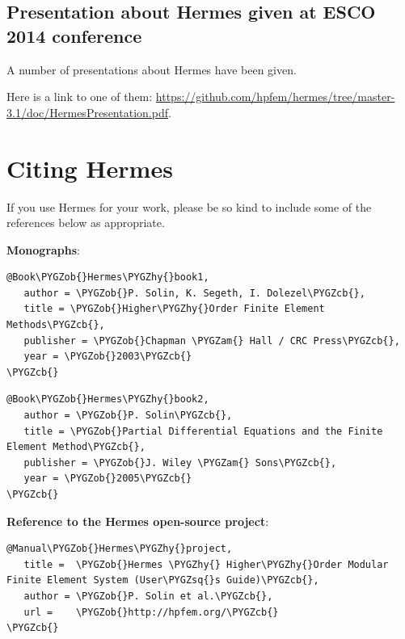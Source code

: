 \documentclass[a4paper,0pt,english]{sphinxmanual}
\let\origfigure=\figure
\renewenvironment{figure}[6]{
\origfigure[H]}
{\endlist}
\def\PYGZob{\char`\{}
\def\PYGZcb{\char`\}}
\def\PYGZam{\char`\&}
\def\PYGZhy{\char`\-}
\def\PYGZsq{\char`\'}
\begin{document}
\subsection{Presentation about Hermes given at ESCO 2014 conference}
\label{src/math-background:presentation-about-hermes-given-at-esco-2014-conference}
A number of presentations about Hermes have been given.
\begin{figure}[htbp]
\centering

\end{figure}

Here is a link to one of them: \href{https://github.com/hpfem/hermes/tree/master-3.1/doc/HermesPresentation.pdf}{https://github.com/hpfem/hermes/tree/master-3.1/doc/HermesPresentation.pdf}.


\section{Citing Hermes}
\label{src/citing-hermes::doc}\label{src/citing-hermes:citing-hermes}
If you use Hermes for your work, please be so kind to include some of the references below as appropriate.

\textbf{Monographs}:

\begin{Verbatim}[commandchars=\\\{\}]
@Book\PYGZob{}Hermes\PYGZhy{}book1,
   author = \PYGZob{}P. Solin, K. Segeth, I. Dolezel\PYGZcb{},
   title = \PYGZob{}Higher\PYGZhy{}Order Finite Element Methods\PYGZcb{},
   publisher = \PYGZob{}Chapman \PYGZam{} Hall / CRC Press\PYGZcb{},
   year = \PYGZob{}2003\PYGZcb{}
\PYGZcb{}
\end{Verbatim}

\begin{Verbatim}[commandchars=\\\{\}]
@Book\PYGZob{}Hermes\PYGZhy{}book2,
   author = \PYGZob{}P. Solin\PYGZcb{},
   title = \PYGZob{}Partial Differential Equations and the Finite Element Method\PYGZcb{},
   publisher = \PYGZob{}J. Wiley \PYGZam{} Sons\PYGZcb{},
   year = \PYGZob{}2005\PYGZcb{}
\PYGZcb{}
\end{Verbatim}

\textbf{Reference to the Hermes open-source project}:

\begin{Verbatim}[commandchars=\\\{\}]
@Manual\PYGZob{}Hermes\PYGZhy{}project,
   title =  \PYGZob{}Hermes \PYGZhy{} Higher\PYGZhy{}Order Modular Finite Element System (User\PYGZsq{}s Guide)\PYGZcb{},
   author = \PYGZob{}P. Solin et al.\PYGZcb{},
   url =    \PYGZob{}http://hpfem.org/\PYGZcb{}
\PYGZcb{}
\end{Verbatim}
\end{document}
